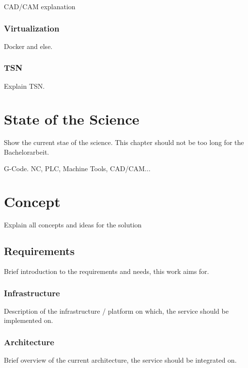\documentclass[
a4paper,
twoside,
bibliography=totoc,
headsepline,
cleardoublepage=empty,
parskip=half,
draft=false
]{scrbook}
\begin{document}
					CAD/CAM explanation
					
				\subsection{Virtualization} \label{subsec:virtualization}
				
					Docker and else.
					
				\subsection{TSN} \label{subsec:tsn}
				
					Explain TSN.
						
	\chapter{State of the Science} \label{ch:state_of_the_Science}
	
		Show the current stae of the science. This chapter should not be too long for the Bachelorarbeit.
		
		G-Code. NC, PLC, Machine Tools, CAD/CAM...
	
	\chapter{Concept} \label{ch:concept}
	
		Explain all concepts and ideas for the solution
		
		\section{Requirements} \label{sec:requirements}
		
			Brief introduction to the requirements and needs, this work aims for.
		
			\subsection{Infrastructure} \label{subsec:infrastructure}
			
				Description of the infrastructure / platform on which, the service should be implemented on.
			
			\subsection{Architecture} \label{subsec:architecture}
			
				Brief overview of the current architecture, the service should be integrated on.
			
\end{document}
